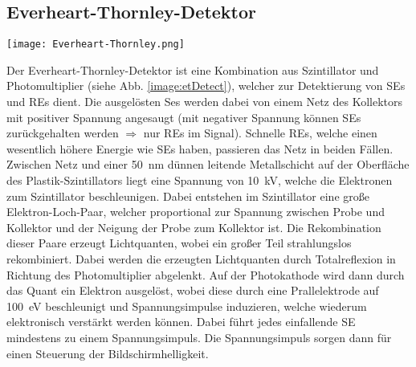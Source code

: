 \subsection*{Everheart-Thornley-Detektor}
\label{sub:etDetect}
\begin{center}
    \texttt{[image: Everheart-Thornley.png]}
    \label{image:etDetect}
\end{center}
Der Everheart-Thornley-Detektor ist eine Kombination aus Szintillator und Photomultiplier (siehe Abb. \ref{image:etDetect}), welcher zur Detektierung von SEs und REs dient. Die ausgelösten Ses werden dabei von einem Netz des Kollektors mit positiver Spannung angesaugt (mit negativer Spannung können SEs zurückgehalten werden $\Rightarrow$ nur REs im Signal). Schnelle REs, welche einen wesentlich höhere Energie wie SEs haben, passieren das Netz in beiden Fällen. Zwischen Netz und einer \SI{50}{\nano\metre} dünnen leitende Metallschicht auf der Oberfläche des Plastik-Szintillators liegt eine Spannung von \SI{10} {\kilo\volt}, welche die Elektronen zum Szintillator beschleunigen. Dabei entstehen im Szintillator eine große Elektron-Loch-Paar, welcher proportional zur Spannung zwischen Probe und Kollektor und der Neigung der Probe zum Kollektor ist. Die Rekombination dieser Paare erzeugt Lichtquanten, wobei ein großer Teil strahlungslos rekombiniert. Dabei werden die erzeugten Lichtquanten durch Totalreflexion in Richtung des Photomultiplier abgelenkt. Auf der Photokathode wird dann durch das Quant ein Elektron ausgelöst, wobei diese durch eine Prallelektrode auf \SI{100}{\electronvolt} beschleunigt und Spannungsimpulse induzieren, welche wiederum elektronisch verstärkt werden können. Dabei führt jedes einfallende SE mindestens zu einem Spannungsimpuls. Die Spannungsimpuls sorgen dann für einen Steuerung der Bildschirmhelligkeit. \citep{RasterEM}

